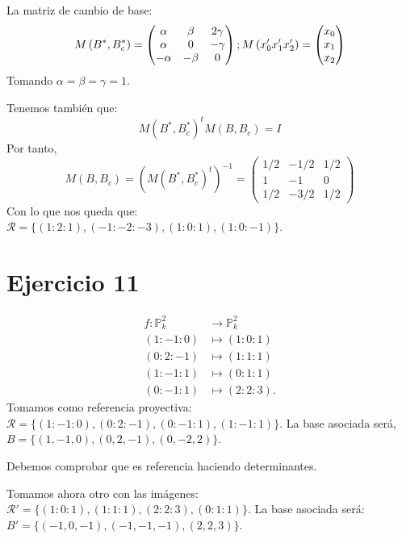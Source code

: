 \documentclass[10pt,a4paper,openright]{book}
\theoremstyle{break}
\begin{document}
La matriz de cambio de base:
\[
    M\left( B^*, B^*_c \right) = \begin{pmatrix} \alpha & \beta & 2\gamma\\ \alpha & 0 & -\gamma\\ -\alpha & -\beta & 0 \end{pmatrix}; M\left( x_0'\\ x_1'\\ x_2' \right) = \begin{pmatrix} x_0\\ x_1\\ x_2 \end{pmatrix}  
\]
Tomando $\alpha = \beta = \gamma = 1$. 

Tenemos también que:
\[
M\left( B^*, B^*_c \right)^t M\left( B, B_c \right) = I
\]
Por tanto, 
\[
    M\left( B, B_c \right) = \left( M\left( B^*, B^*_c \right)^t \right)^{-1} = \begin{pmatrix} 1/2 & -1/2 & 1/2\\ 1 & -1 & 0\\ 1/2 & -3/2 & 1/2 \end{pmatrix} 
\]
Con lo que nos queda que: $\mathcal{R} = \{\left( 1 : 2 : 1 \right), \left( -1 : -2 : -3 \right), \left( 1 : 0 : 1 \right), \left( 1 : 0 : -1 \right)\}$.

\section{Ejercicio 11}%
\label{sec:ejercicio_11_3}
\begin{align*}
    f: \mathbb{P}^{2}_{k} &\rightarrow \mathbb{P}^{2}_{k} \\
    \left( 1 : -1: 0 \right) &\mapsto \left( 1 : 0 : 1 \right) \\
    \left( 0 : 2 : -1 \right) &\mapsto \left( 1 : 1 : 1 \right)\\
    \left( 1 : -1: 1 \right) &\mapsto \left( 0 : 1 : 1 \right)\\
    \left( 0 : -1 : 1 \right) &\mapsto \left( 2 : 2 : 3 \right) 
.\end{align*}
Tomamos como referencia proyectiva: $\mathcal{R} = \{\left( 1 : -1 : 0 \right), \left( 0 : 2 : -1 \right), \left( 0 : -1 : 1 \right), \left( 1 : -1 : 1 \right)\}$. La base asociada será, $B = \{\left( 1, -1, 0 \right), \left( 0, 2, -1 \right), \left( 0, -2, 2 \right)\}$.

Debemos comprobar que es referencia haciendo determinantes.

Tomamos ahora otro con las imágenes: $\mathcal{R}' = \{\left( 1 : 0 : 1 \right), \left( 1 : 1 : 1 \right), \left( 2 : 2 : 3 \right), \left( 0 : 1 : 1 \right)\}$. La base asociada será: $B' = \{\left( -1, 0, -1 \right), \left( -1, -1, -1 \right), \left( 2, 2, 3 \right)\}$.
\end{document}

